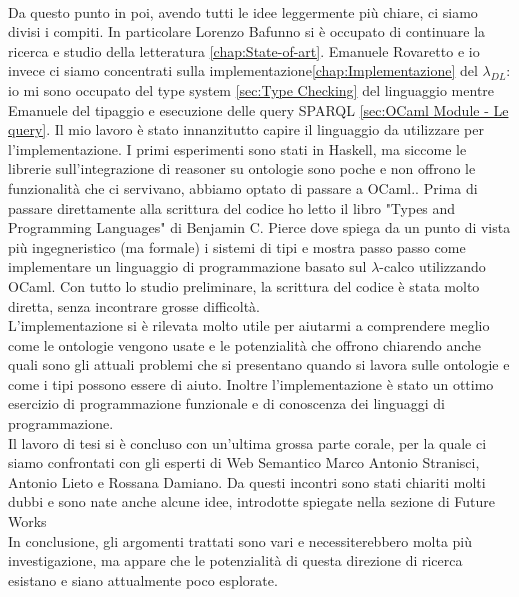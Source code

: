 \\Da questo punto in poi, avendo tutti le idee leggermente più chiare, ci siamo divisi i compiti. In particolare Lorenzo Bafunno si
è occupato di continuare la ricerca e studio della letteratura \ref{chap:State-of-art}. Emanuele Rovaretto e io invece ci siamo concentrati sulla implementazione\ref{chap:Implementazione}
del $\lambda_{DL}$: io mi sono occupato del type system \ref{sec:Type Checking} del linguaggio mentre Emanuele del tipaggio e esecuzione delle query SPARQL \ref{sec:OCaml Module - Le query}.
Il mio lavoro è stato innanzitutto capire il linguaggio da utilizzare per l'implementazione. I primi esperimenti sono stati in Haskell, ma siccome le librerie
sull'integrazione di reasoner su ontologie sono poche e non offrono le funzionalità che ci servivano, abbiamo optato di passare a OCaml.. 
Prima di passare direttamente alla scrittura del codice ho letto il libro "Types and Programming Languages" \cite{TypesAndProgrammingLanguages} di Benjamin C. Pierce dove spiega da un punto di vista
più ingegneristico (ma formale) i sistemi di tipi e mostra passo passo come implementare un linguaggio di programmazione basato sul $\lambda$-calco utilizzando OCaml.
Con tutto lo studio preliminare, la scrittura del codice è stata molto diretta, senza incontrare grosse difficoltà.
\\L'implementazione si è rilevata molto utile per aiutarmi a comprendere meglio come le ontologie vengono usate e le potenzialità che offrono chiarendo anche
quali sono gli attuali problemi che si presentano quando si lavora sulle ontologie e come i tipi possono essere di aiuto. Inoltre l'implementazione è stato un ottimo
esercizio di programmazione funzionale e di conoscenza dei linguaggi di programmazione.
\\Il lavoro di tesi si è concluso con un'ultima grossa parte corale, per la quale ci siamo confrontati con gli esperti
di Web Semantico Marco Antonio Stranisci, Antonio Lieto e Rossana Damiano. Da questi incontri sono stati chiariti molti dubbi e sono nate anche alcune idee, introdotte
spiegate nella sezione di Future Works %
\\In conclusione, gli argomenti trattati sono vari e necessiterebbero molta più investigazione, ma appare che le potenzialità di questa direzione di ricerca esistano e siano attualmente poco esplorate. 